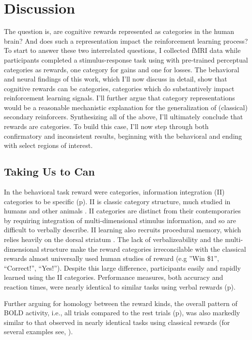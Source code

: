 \section{Discussion} %
\label{sec:dicussion}
The question is, are cognitive rewards represented as categories in the human brain?  And does such a representation impact the reinforcement learning process?  To start to answer these two interrelated questions, I collected fMRI data while participants completed a stimulus-response task using with pre-trained perceptual categories as rewards, one category for gains and one for losses.  The behavioral and neural findings of this work, which I'll now discuss in detail, show that cognitive rewards can be categories, categories which do substantively impact reinforcement learning signals.  I'll further argue that category representations would be a reasonable mechanistic explanation for the generalization of (classical) secondary reinforcers.  Synthesizing all of the above, I'll ultimately conclude that rewards are categories.  To build this case, I'll now step through both confirmatory and inconsistent results, beginning with the behavioral and ending with select regions of interest.

\subsection{Taking Us to Can}
\label{sub:tocan}
In the behavioral task reward were categories, information integration (II) categories to be specific (p\pageref{subsub:whatwhen}).  II is classic category structure, much studied in humans and other animals \cite{Smith:2011p9101,Ashby:2011p9148,Smith:2010p9713}.  II categories are distinct from their contemporaries by requiring integration of multi-dimensional stimulus information, and so are difficult to verbally describe. II learning also recruits procedural memory, which relies heavily on the dorsal striatum \cite{Ashby:1998p9716}.   The lack of verbalizeability and the multi-dimensional structure make the reward categories irreconcilable with the classical rewards almost universally used human studies of reward (e.g ''Win \$1'', ``Correct!'', ``Yes!'').  Despite this large difference, participants easily and rapidly learned using the II categories.  Performance measures, both accuracy and reaction times, were nearly identical to similar tasks using verbal rewards (p\pageref{subsub:wellbehaved}).  

Further arguing for homology between the reward kinds, the overall pattern of BOLD activity, i.e., all trials compared to the rest trials (p\pageref{sub:blob}), was also markedly similar to that observed in nearly identical tasks using classical rewards (for several examples see, ).


